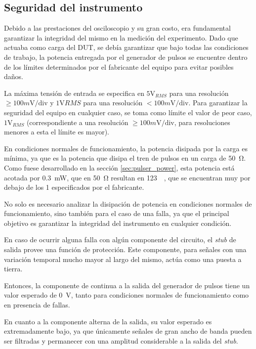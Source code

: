\subsection{Seguridad del instrumento}

Debido a las prestaciones del osciloscopio y su gran costo, era fundamental
garantizar la integridad del mismo en la medición del experimento. Dado que
actuaba como carga del DUT, se debía garantizar que bajo todas las condiciones
de trabajo, la potencia entregada por el generador de pulsos se encuentre dentro
de los límites determinados por el fabricante del equipo para evitar posibles
daños.

La máxima tensión de entrada se especifica en $5\text{V}_{RMS}$ para una
resolución $\geq100m\text{V}/\text{div}$ y $1 \text{V}{RMS}$ para una resolución
$<100 m\text{V}/\text{div}$.  Para garantizar la seguridad del equipo en
cualquier caso, se toma como límite el valor de peor caso, $1\text{V}_{RMS}$
(correspondiente a una resolución $\geq 100 m\text{V/div}$, para resoluciones
menores a esta el límite es mayor).

En condiciones normales de funcionamiento, la potencia disipada por la carga es
mínima, ya que es la potencia que disipa el tren de pulsos en un carga de
\qty{50}{\ohm}. Como fuese desarrollado en la sección \ref{sec:pulser_power},
esta potencia está acotada por \qty{0.3}{\milli\watt}, que en \qty{50}{\ohm}
resultan en \qty{123}{\milli\voltRMS}, que se encuentran muy por debajo de los
\qty{1}{\voltRMS} especificados por el fabricante.

No solo es necesario analizar la disipación de potencia en condiciones normales
de funcionamiento, sino también para el caso de una falla, ya que el principal
objetivo es garantizar la integridad del instrumento en cualquier condición.

En caso de ocurrir alguna falla con algún componente del circuito, el \textit{stub}
de salida provee una función de protección. Este componente, para señales con
una variación temporal mucho mayor al largo del mismo, actúa como una puesta a
tierra.

Entonces, la componente de continua a la salida del generador de pulsos tiene un
valor esperado de \qty{0}{\volt}, tanto para condiciones normales de 
funcionamiento como en presencia de fallas.

En cuanto a la componente alterna de la salida, su valor esperado es
extremadamente bajo, ya que únicamente señales de gran ancho de banda pueden ser
filtradas y permanecer con una amplitud considerable a la salida del 
\textit{stub}.

